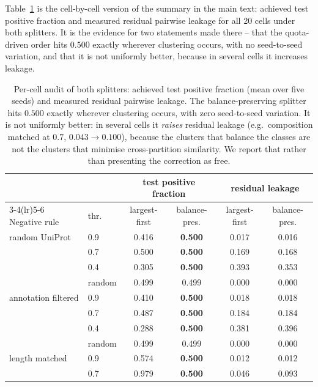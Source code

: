 \documentclass[11pt,a4paper]{article}
\begin{document}
Table~\ref{tab:balanceaudit} is the cell-by-cell version of the summary in the
main text: achieved test positive fraction and measured residual pairwise
leakage for all 20 cells under both splitters. It is the evidence for two
statements made there -- that the quota-driven order hits $0.500$ exactly
wherever clustering occurs, with no seed-to-seed variation, and that it is not
uniformly better, because in several cells it increases leakage.

\begin{table}[htbp]\centering\small
\caption{Per-cell audit of both splitters: achieved test positive fraction (mean over five
seeds) and measured residual pairwise leakage. The balance-preserving splitter hits
$0.500$ exactly wherever clustering occurs, with zero seed-to-seed variation. It is not
uniformly better: in several cells it \emph{raises} residual leakage (e.g.\ composition
matched at $0.7$, $0.043 \to 0.100$), because the clusters that balance the classes are not
the clusters that minimise cross-partition similarity. We report that rather than
presenting the correction as free.}
\label{tab:balanceaudit}
\begin{tabular}{llcccc}
\toprule
 & & \multicolumn{2}{c}{test positive fraction} & \multicolumn{2}{c}{residual leakage} \\
\cmidrule(lr){3-4}\cmidrule(lr){5-6}
Negative rule & thr. & largest-first & balance-pres. & largest-first & balance-pres. \\
\midrule
random UniProt      & 0.9    & 0.416 & \textbf{0.500} & 0.017 & 0.016 \\
                    & 0.7    & 0.500 & \textbf{0.500} & 0.169 & 0.168 \\
                    & 0.4    & 0.305 & \textbf{0.500} & 0.393 & 0.353 \\
                    & random & 0.499 & 0.499 & 0.000 & 0.000 \\
\addlinespace
annotation filtered & 0.9    & 0.410 & \textbf{0.500} & 0.018 & 0.018 \\
                    & 0.7    & 0.487 & \textbf{0.500} & 0.184 & 0.184 \\
                    & 0.4    & 0.288 & \textbf{0.500} & 0.381 & 0.396 \\
                    & random & 0.499 & 0.499 & 0.000 & 0.000 \\
\addlinespace
length matched      & 0.9    & 0.574 & \textbf{0.500} & 0.012 & 0.012 \\
                    & 0.7    & 0.979 & \textbf{0.500} & 0.046 & 0.093 \\

\end{tabular}
\end{table}
\end{document}
